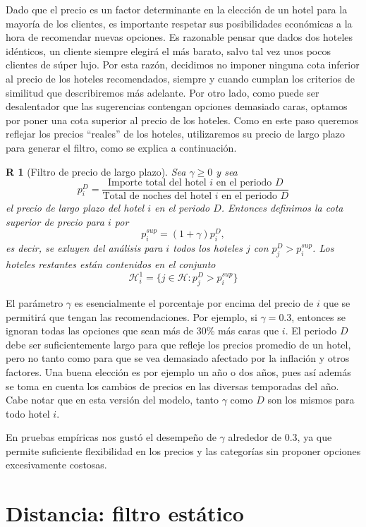 \documentclass[12pt]{report}
\newcommand{\HH}{\mathcal{H}}
\newtheorem{regla}{R}%
\begin{document}
Dado que el precio es un factor determinante en la elección de un hotel para la mayoría de los clientes, es importante respetar sus posibilidades económicas a la hora de recomendar nuevas opciones. Es razonable pensar que dados dos hoteles idénticos, un cliente siempre elegirá el más barato, salvo tal vez unos pocos clientes de súper lujo. Por esta razón, decidimos no imponer ninguna cota inferior al precio de los hoteles recomendados, siempre y cuando cumplan los criterios de similitud que describiremos más adelante. Por otro lado, como puede ser desalentador que las sugerencias contengan opciones demasiado caras, optamos por poner una cota superior al precio de los hoteles. Como en este paso queremos reflejar los precios ``reales'' de los hoteles, utilizaremos su precio de largo plazo para generar el filtro, como se explica a continuación.
\begin{regla}[Filtro de precio de largo plazo] \label{r:preciolargo}
Sea $\gamma \geq 0$ y sea
\[
p^D_i = \frac{\text{Importe total del hotel $i$ en el periodo $D$}}{\text{Total de noches del hotel $i$ en el periodo $D$}}
\]
el precio de largo plazo del hotel $i$ en el periodo $D$. Entonces definimos la cota superior de precio para $i$ por 
\[
p^{sup}_i = (1 + \gamma)p^D_i,
\]
es decir, se exluyen del análisis para $i$ todos los hoteles $j$ con $p^D_j > p^{sup}_i$. Los hoteles restantes están contenidos en el conjunto
\[
\HH_i^1 = \{j \in \HH : p^D_j > p^{sup}_i\}
\]
\end{regla}
El parámetro $\gamma$ es esencialmente el porcentaje por encima del precio de $i$ que se permitirá que tengan las recomendaciones. Por ejemplo, si $\gamma = 0.3$, entonces se ignoran todas las opciones que sean más de 30\% más caras que $i$. El periodo $D$ debe ser suficientemente largo para que refleje los precios promedio de un hotel, pero no tanto como para que se vea demasiado afectado por la inflación y otros factores. Una buena elección es por ejemplo un año o dos años, pues así además se toma en cuenta los cambios de precios en las diversas temporadas del año. Cabe notar que en esta versión del modelo, tanto $\gamma$ como $D$ son los mismos para todo hotel $i$.

En pruebas empíricas nos gustó el desempeño de $\gamma$ alrededor de 0.3, ya que permite suficiente flexibilidad en los precios y las categorías sin proponer opciones excesivamente costosas.

\section{Distancia: filtro estático}
\end{document}
